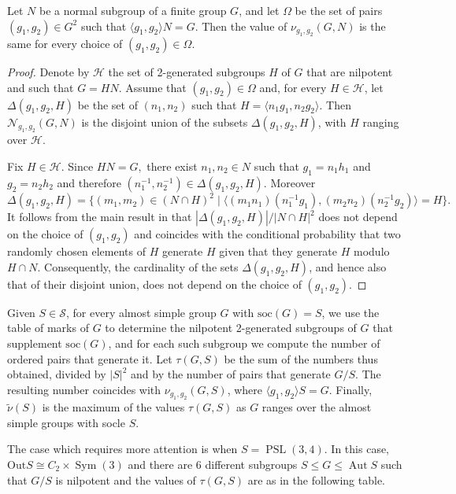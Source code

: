 \documentclass{amsart}
\DeclareMathOperator{\perm}{Sym}
\DeclareMathOperator{\aut}{Aut}
\DeclareMathOperator{\psl}{PSL}
\numberwithin{equation}{section}
\begin{document}
\begin{lemma}
	Let $N$ be a normal subgroup of a finite group $G$, and let $\Omega$ be the set of pairs $(g_1, g_2) \in G^2$ such that $\langle g_1, g_2 \rangle N = G$. Then the value of $\nu_{g_1, g_2}(G, N)$ is the same for every choice of $(g_1, g_2) \in \Omega$.
\end{lemma}
\begin{proof}
 Denote by $\mathcal H$ the set of  2-generated subgroups $H$ of $G$ that are nilpotent and such that $G=HN$. Assume that $(g_1,g_2)\in \Omega$ and,
for every $H\in \mathcal H$, let $\Delta(g_1,g_2,H)$ be the set of $(n_1,n_2)$ such that $H=\langle n_1g_1,n_2g_2\rangle.$
Then $\mathcal N_{g_1,g_2}(G,N)$ is the disjoint union of the subsets $\Delta(g_1,g_2,H)$, with $H$ ranging  over $\mathcal H.$

Fix $H\in \mathcal H$. Since $HN=G,$ there exist $n_1,n_2\in N$ such that $g_1=n_1h_1$ and $g_2=n_2h_2$ and therefore $(n_1^{-1},n_2^{-1})\in \Delta(g_1,g_2,H)$. Moreover
$$\Delta(g_1,g_2,H)=\{(m_1,m_2)\in (N\cap H)^2\mid \langle (m_1n_1)(n_1^{-1}g_1),(m_2n_2)(n_2^{-1}g_2)\rangle=H\}.$$
It follows from the main result in \cite{gaz} that
$|\Delta(g_1,g_2,H)|/|N\cap H|^2$ does not depend on the choice of $(g_1,g_2)$ and coincides with the conditional probability that two randomly chosen elements of $H$ generate $H$ given that they generate $H$ modulo $H\cap N.$ Consequently, the cardinality of the sets $\Delta(g_1,g_2,H)$, and hence also that of their disjoint union, does not depend on the choice of $(g_1, g_2)$.
\end{proof}
Given $S \in \mathcal{S}$, for every almost simple group $G$ with $\mathrm{soc}(G) = S$, we use the table of marks of $G$ to determine the nilpotent 2-generated subgroups of $G$ that supplement $\mathrm{soc}(G)$, and for each such subgroup we compute the number of ordered pairs that generate it. Let $\tau(G, S)$ be the sum of the numbers thus obtained, divided by $|S|^2$ and by the number of pairs that generate $G/S$. The resulting number coincides with $\nu_{g_1, g_2}(G, S)$, where $\langle g_1, g_2 \rangle S = G$. Finally, $\tilde{\nu}(S)$ is the maximum of the values $\tau(G, S)$ as $G$ ranges over the almost simple groups with socle $S$.

The case which requires more attention is when $S=\psl(3,4)$. In this case, $\mathrm{Out}S\cong C_2\times \perm(3)$ and there are 6 different subgroups $S\leq G\leq \aut S$ such that $G/S$ is nilpotent and the values of $\tau(G,S)$ are as in the following table.
\end{document}
